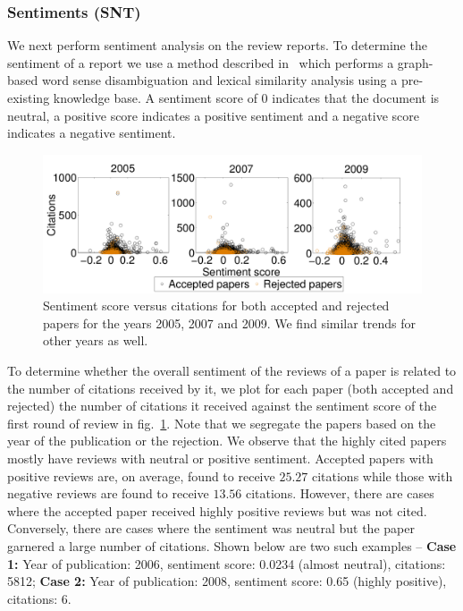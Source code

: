 \subsubsection{Sentiments (SNT)}
We next perform sentiment analysis on the review reports. To determine the sentiment of a report we use a method described in~\cite{montejo2012random} which performs a graph-based word sense disambiguation and lexical similarity analysis using a pre-existing knowledge base. A sentiment score of 0 indicates that the document is neutral, a positive score  indicates a positive sentiment and a negative score indicates a negative sentiment. 


\begin{figure}[htpb]
\centering
\includegraphics[scale=0.23]{figures/year_sent_cit-eps-converted-to.pdf}
\caption{Sentiment score versus citations for both accepted and rejected papers for the years 2005, 2007 and 2009. We find similar trends for other years as well.}
\label{fig12}
\vspace{-2mm}
\end{figure}

To determine whether the overall sentiment of the reviews of a paper is related to the number of citations received by it, we plot for each paper (both accepted and rejected) the number of citations it received against the  sentiment score of the first round of review in fig.~\ref{fig12}. Note that we segregate the papers based on the year of the publication or the rejection. We observe that the highly cited papers mostly have reviews with neutral or positive sentiment. Accepted papers with positive reviews are, on average, found to receive $25.27$ citations while those with negative reviews are found to receive $13.56$ citations.
However, there are cases where the accepted paper received highly positive reviews but was not cited. Conversely, there are cases where the sentiment was neutral but the paper garnered a large number of citations. Shown below are two such examples -- {\bf Case 1:} Year of publication: 2006, sentiment score: 0.0234 (almost neutral), citations: 5812; {\bf Case 2:} Year of publication: 2008, sentiment score: 0.65 (highly positive), citations: 6.


